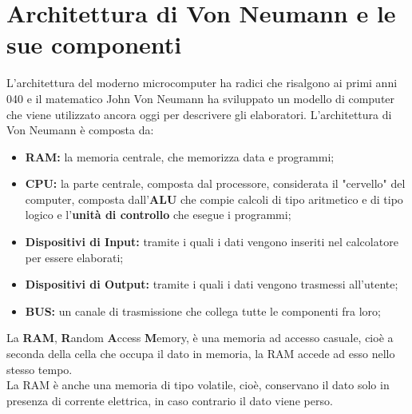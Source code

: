 \documentclass[12pt]{report}
\begin{document}
		\section{Architettura di Von Neumann e le sue componenti}
		L'architettura del moderno microcomputer ha radici che risalgono ai primi anni 040 e il matematico John Von Neumann ha sviluppato un modello di computer che viene utilizzato ancora oggi per descrivere gli elaboratori.
		L'architettura di Von Neumann è composta da:
		\begin{itemize}
			\item \textbf{RAM: }la memoria centrale, che memorizza data e programmi;
			\item \textbf{CPU: }la parte centrale, composta dal processore, considerata il "cervello" del computer, composta dall'\textbf{ALU} che compie calcoli di tipo aritmetico e di tipo logico e l'\textbf{unità di controllo} che esegue i programmi;
			\item \textbf{Dispositivi di Input: }tramite i quali i dati vengono inseriti nel calcolatore per essere elaborati;
			\item \textbf{Dispositivi di Output: }tramite i quali i dati vengono trasmessi all'utente;
			\item \textbf{BUS: }un canale di trasmissione che collega tutte le componenti fra loro;
		\end{itemize}
		La \textbf{RAM}, \textbf{R}andom \textbf{A}ccess \textbf{M}emory, è una memoria ad accesso casuale, cioè a seconda della cella che occupa il dato in memoria, la RAM accede ad esso nello stesso tempo.
		\\
		La RAM è anche una memoria di tipo volatile, cioè, conservano il dato solo in presenza di corrente elettrica, in caso contrario il dato viene perso.
\end{document}
